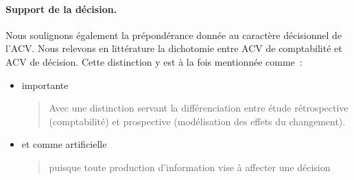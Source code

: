 \paragraph{Support de la décision.}
Nous soulignons également la prépondérance donnée au caractère décisionnel de l'\gls{ACV}.
Nous relevons en littérature la dichotomie entre \gls{ACV} de comptabilité et \gls{ACV} de décision.
Cette distinction y est à la fois mentionnée comme~:
\begin{itemize}
\item importante

\blockcquote[p.114, sec.2]{tillman_significance_2000}{Avec une distinction servant la différenciation entre étude rétrospective (comptabilité) et prospective (modélisation des effets du changement).}
\item et comme artificielle

\blockcquote{weidema_application_1998}{puisque toute production d'information vise à affecter une décision}.
\end{itemize} 


%
%
%
%
%

